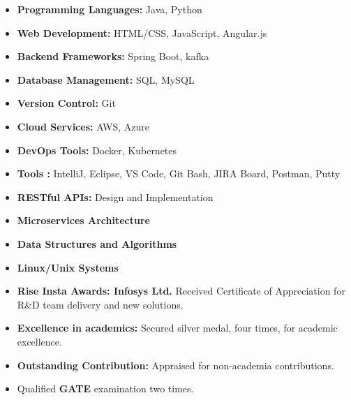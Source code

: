 \begin{itemize}
    \item \textbf{Programming Languages:} Java, Python
    \item \textbf{Web Development:} HTML/CSS, JavaScript, Angular.js
    \item \textbf{Backend Frameworks:} Spring Boot, kafka
    \item \textbf{Database Management:} SQL, MySQL
    \item \textbf{Version Control:} Git
    \item \textbf{Cloud Services:} AWS, Azure
    \item \textbf{DevOps Tools:} Docker, Kubernetes
    \item \textbf{ Tools :} IntelliJ, Eclipse, VS Code, Git Bash, JIRA Board, Postman, Putty
    \item \textbf{RESTful APIs:} Design and Implementation
    \item \textbf{Microservices Architecture}
    \item \textbf{Data Structures and Algorithms}
    \item \textbf{Linux/Unix Systems}
\end{itemize}



\begin{itemize}
    \item \textbf{Rise Insta Awards: Infosys Ltd.} Received Certificate of Appreciation for R\&D team delivery and new solutions.
    \item \textbf{Excellence in academics:} Secured silver medal, four times, for academic excellence.
    \item \textbf{Outstanding Contribution:} Appraised for non-academia contributions.
    \item Qualified \textbf{GATE} examination two times.
\end{itemize}


